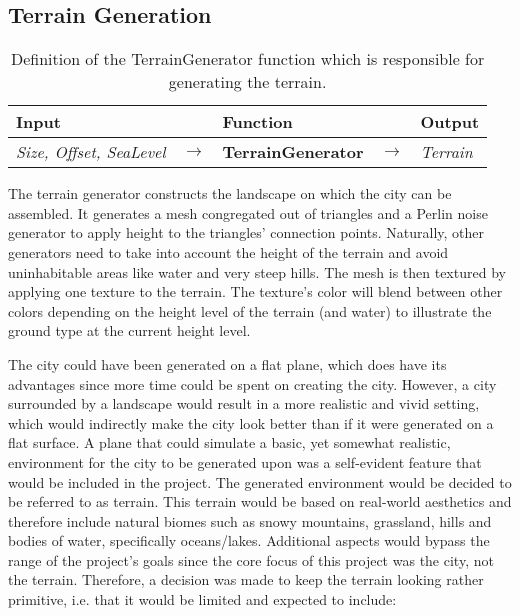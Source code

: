 \subsection{Terrain Generation}

\begin{table}[H]
 \centering
 \begin{tabular}{lllll}
  \textbf{Input} & & \textbf{Function} & & \textbf{Output} \\
  \midrule
  \textit{Size, Offset, SeaLevel} & $\rightarrow$ & \textbf{TerrainGenerator} & $\rightarrow$ & \textit{Terrain} \\
  \bottomrule
 \end{tabular}

 \caption{Definition of the TerrainGenerator function which is responsible for generating the terrain.}
 \label{table:terrgen}
 \end{table}
\vspace{-0.4cm} %


The terrain generator constructs the landscape on which the city can be assembled.
It generates a mesh congregated out of triangles and a Perlin noise generator to apply height to the triangles' connection points.
Naturally, other generators need to take into account the height of the terrain and avoid uninhabitable areas like water and very steep hills.
The mesh is then textured by applying one texture to the terrain.
The texture's color will blend between other colors depending on the height level of the terrain (and water) to illustrate the ground type at the current height level.

The city could have been generated on a flat plane, which does have its advantages since more time could be spent on creating the city.
However, a city surrounded by a landscape would result in a more realistic and vivid setting, which would indirectly make the city look better than if it were generated on a flat surface.
A plane that could simulate a basic, yet somewhat realistic, environment for the city to be generated upon was a self-evident feature that would be included in the project.
The generated environment would be decided to be referred to as terrain.
This terrain would be based on real-world aesthetics and therefore include natural biomes such as snowy mountains, grassland, hills and bodies of water, specifically oceans/lakes.
Additional aspects would bypass the range of the project's goals since the core focus of this project was the city, not the terrain.
Therefore, a decision was made to keep the terrain looking rather primitive, i.e. that it would be limited and expected to include: 

